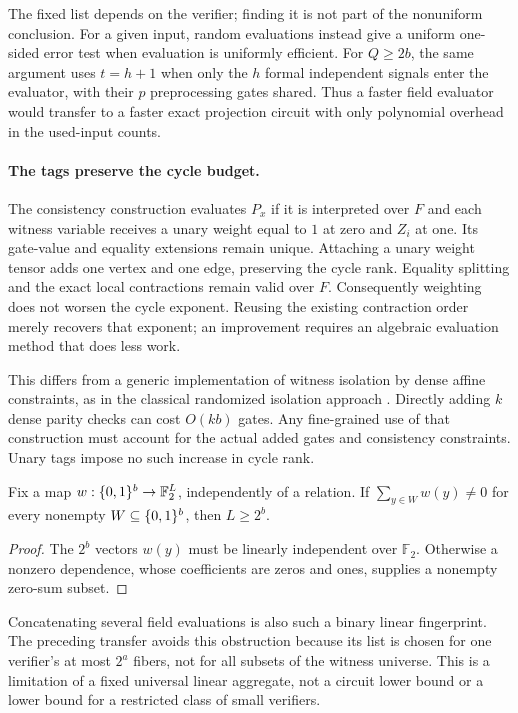 The fixed list depends on the verifier; finding it is not part of
the nonuniform conclusion. For a given input, random evaluations
instead give a uniform one-sided error test when evaluation is
uniformly efficient. For $Q\ge2b$, the same argument uses $t=h+1$ when only the
$h$ formal independent signals enter the evaluator, with their $p$
preprocessing gates shared. Thus a faster field evaluator would
transfer to a faster exact projection circuit with only polynomial
overhead in the used-input counts.

\paragraph{The tags preserve the cycle budget.}
The consistency construction evaluates $P_x$ if it is interpreted
over $F$ and each witness variable receives a unary weight equal to
$1$ at zero and $Z_i$ at one. Its gate-value and equality extensions
remain unique. Attaching a unary weight tensor adds one vertex and
one edge, preserving the cycle rank. Equality splitting and the exact
local contractions remain valid over $F$. Consequently weighting
does not worsen the cycle exponent. Reusing the existing contraction
order merely recovers that exponent; an improvement requires an
algebraic evaluation method that does less work.

This differs from a generic implementation of witness isolation by
dense affine constraints, as in the classical randomized isolation
approach \citep{ValiantVazirani1986}. Directly adding $k$ dense parity
checks can cost $O(kb)$ gates. Any fine-grained use of that construction
must account for the actual added gates and consistency constraints.
Unary tags impose no such increase in cycle rank.

\begin{proposition}
\label{prop:universal-fingerprint}
Fix a map $w:\{0,1\}^b\to\mathbb F_2^L$, independently of a relation.
If $\sum_{y\in W}w(y)\ne0$ for every nonempty
$W\subseteq\{0,1\}^b$, then $L\ge2^b$.
\end{proposition}
\begin{proof}
The $2^b$ vectors $w(y)$ must be linearly independent over
$\mathbb F_2$. Otherwise a nonzero dependence, whose coefficients
are zeros and ones, supplies a nonempty zero-sum subset.
\end{proof}

Concatenating several field evaluations is also such a binary linear
fingerprint. The preceding transfer avoids this obstruction because
its list is chosen for one verifier's at most $2^a$ fibers, not for
all subsets of the witness universe. This is a limitation of a fixed
universal linear aggregate, not a circuit lower bound or a lower
bound for a restricted class of small verifiers.

